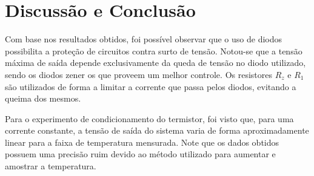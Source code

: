 \newpage
\section{Discussão e Conclusão}
Com base nos resultados obtidos, foi possível observar que o uso de diodos possibilita a proteção de circuitos contra surto de tensão. Notou-se que a tensão máxima de saída depende exclusivamente da queda de tensão no diodo utilizado, sendo os diodos zener os que proveem um melhor controle.
Os resistores $R_z$ e $R_1$ são utilizados de forma a limitar a corrente que passa pelos diodos, evitando a queima dos mesmos.

Para o experimento de condicionamento do termistor, foi visto que, para uma corrente constante, a tensão de saída do sistema varia de forma aproximadamente linear para a faixa de temperatura mensurada. Note que os dados obtidos possuem uma precisão ruim devido ao método utilizado para aumentar e amostrar a temperatura.